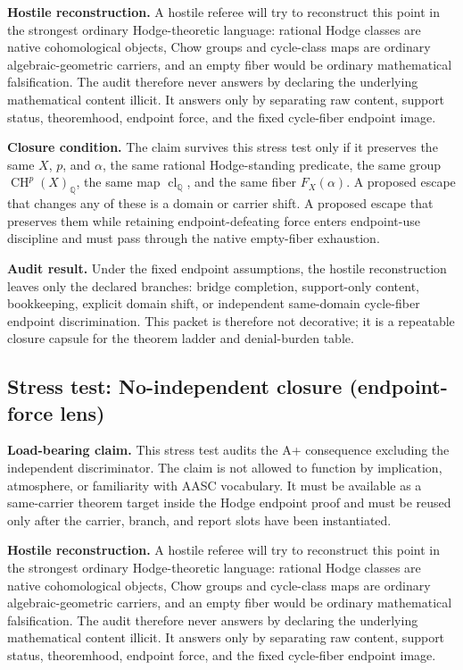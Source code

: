 \documentclass[11pt]{article}
\newcommand{\QQ}{\mathbb{Q}}
\newcommand{\CH}{\operatorname{CH}}
\newcommand{\clQ}{\operatorname{cl}_{\QQ}}
\begin{document}
\par\noindent\textbf{Hostile reconstruction.} A hostile referee will try to reconstruct this point in the strongest ordinary Hodge-theoretic language: rational Hodge classes are native cohomological objects, Chow groups and cycle-class maps are ordinary algebraic-geometric carriers, and an empty fiber would be ordinary mathematical falsification. The audit therefore never answers by declaring the underlying mathematical content illicit. It answers only by separating raw content, support status, theoremhood, endpoint force, and the fixed cycle-fiber endpoint image.

\par\noindent\textbf{Closure condition.} The claim survives this stress test only if it preserves the same $X$, $p$, and $\alpha$, the same rational Hodge-standing predicate, the same group $\CH^p(X)_\QQ$, the same map $\clQ$, and the same fiber $F_X(\alpha)$. A proposed escape that changes any of these is a domain or carrier shift. A proposed escape that preserves them while retaining endpoint-defeating force enters endpoint-use discipline and must pass through the native empty-fiber exhaustion.

\par\noindent\textbf{Audit result.} Under the fixed endpoint assumptions, the hostile reconstruction leaves only the declared branches: bridge completion, support-only content, bookkeeping, explicit domain shift, or independent same-domain cycle-fiber endpoint discrimination. This packet is therefore not decorative; it is a repeatable closure capsule for the theorem ladder and denial-burden table.


\subsection{Stress test: No-independent closure (endpoint-force lens)}

\par\noindent\textbf{Load-bearing claim.} This stress test audits the A+ consequence excluding the independent discriminator. The claim is not allowed to function by implication, atmosphere, or familiarity with AASC vocabulary. It must be available as a same-carrier theorem target inside the Hodge endpoint proof and must be reused only after the carrier, branch, and report slots have been instantiated.

\par\noindent\textbf{Hostile reconstruction.} A hostile referee will try to reconstruct this point in the strongest ordinary Hodge-theoretic language: rational Hodge classes are native cohomological objects, Chow groups and cycle-class maps are ordinary algebraic-geometric carriers, and an empty fiber would be ordinary mathematical falsification. The audit therefore never answers by declaring the underlying mathematical content illicit. It answers only by separating raw content, support status, theoremhood, endpoint force, and the fixed cycle-fiber endpoint image.
\end{document}
